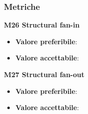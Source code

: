         \subsubsection{Metriche}
            \textbf{M26 Structural fan-in}
                \begin{itemize}
                    \item \textbf{Valore preferibile}: 
                    \item \textbf{Valore accettabile}:
                \end{itemize}
            \textbf{M27 Structural fan-out}
                \begin{itemize}
                    \item \textbf{Valore preferibile}: 
                    \item \textbf{Valore accettabile}: 
                \end{itemize}
